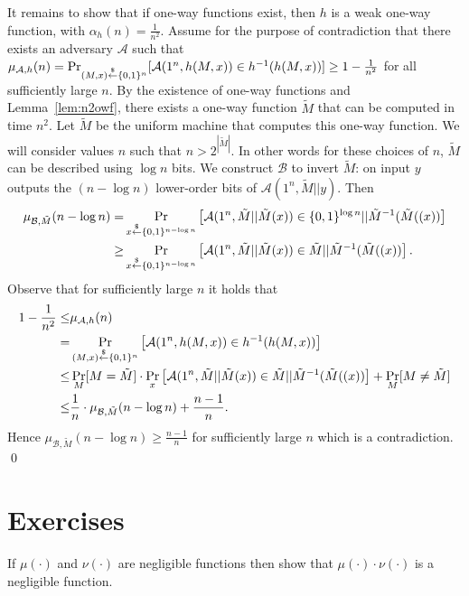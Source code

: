 It remains to show that if one-way functions exist, then $h$ is a weak one-way function, with $\alpha_h(n) = \frac{1}{n^2}$.
Assume for the purpose of contradiction that there exists an adversary $\mathcal{A}$ such that $\mu_{\mathcal{A},h}(n) = \Pr_{(M,x) \stackrel{\$}{\leftarrow} \{ 0, 1 \}^{n}}[ \mathcal{A}(1^{n}, h(M,x)) \in h^{-1}(h(M,x))]\geq 1-\frac{1}{n^2}$ for all sufficiently large $n$.
By the existence of one-way functions and Lemma~\ref{lem:n2owf}, there exists a one-way function $\tilde M$ that can be computed in time $n^2$. Let $\tilde M$ be the uniform machine that computes this one-way function.
We will consider values $n$ such that $n > 2^{|\tilde M|}$. In other words for these choices of $n$, $\tilde M$ can be described using $\log n$ bits.
We construct $\mathcal{B}$ to invert $\tilde M$: on input $y$ outputs the $(n-\log n)$ lower-order bits of $\mathcal{A}(1^n, \tilde M||y)$. Then
\begin{align*}
\mu_{\mathcal{B},\tilde M}(n-\log n) =& \Pr_{x \stackrel{\$}{\leftarrow} \{ 0, 1 \}^{n-\log n}}\left[\mathcal{A}(1^{n}, \tilde M || \tilde M(x)) \in \{ 0, 1 \}^{\log n} || \tilde M^{-1}(\tilde M((x))\right]\\
\geq& \Pr_{x \stackrel{\$}{\leftarrow} \{ 0, 1 \}^{n-\log n}}\left[\mathcal{A}(1^{n}, \tilde M || \tilde M(x)) \in \tilde{M} || \tilde M^{-1}(\tilde M((x))\right].
\end{align*}
Observe that for sufficiently large $n$ it holds that
\begin{align*}
1-\frac{1}{n^2} \leq& \mu_{\mathcal{A},h}(n)\\
=& \Pr_{(M,x) \stackrel{\$}{\leftarrow} \{ 0, 1 \}^{n}}\left[ \mathcal{A}(1^{n}, h(M,x)) \in h^{-1}(h(M,x))\right]\\
\leq& \Pr_{M }[M = \tilde M] \cdot \Pr_{x }\left[ \mathcal{A}(1^{n}, \tilde M||\tilde M(x)) \in  \tilde{M} || \tilde M^{-1}(\tilde M((x))\right] + \Pr_{M }[M \neq \tilde M]  \\
\leq&  \frac{1}{n} \cdot \mu_{\mathcal{B},\tilde M}(n-\log n) +\frac{n-1}{n}.
\end{align*}
Hence $\mu_{\mathcal{B},\tilde M}(n-\log n) \geq \frac{n-1}{n}$  for sufficiently large $n$ which is a contradiction.
\qed

\newpage
\section*{Exercises}
\begin{exercise}
\label{ex:product} If $\mu(\cdot)$ and $\nu(\cdot)$ are negligible functions then show that $\mu(\cdot) \cdot \nu(\cdot)$ is a negligible function.
\end{exercise}

